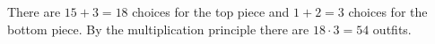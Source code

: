 There are $15+3=18$ choices for the top piece and $1+2=3$ choices for the bottom piece. By the multiplication principle there are $18\cdot3=\boxed{54}$ outfits.
